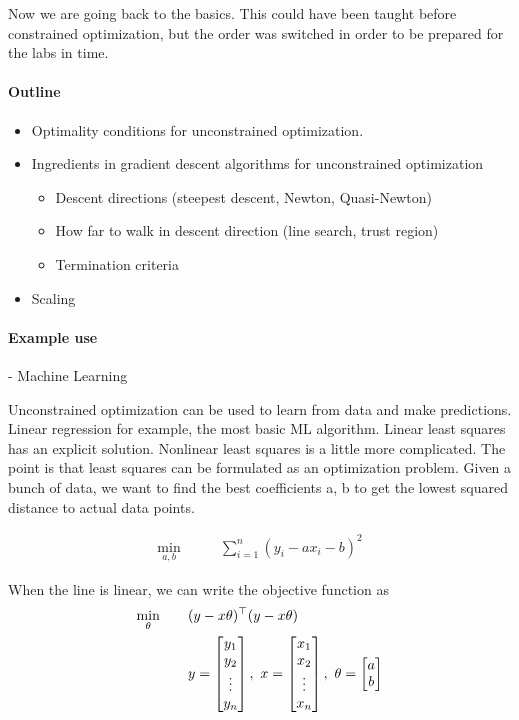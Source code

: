 \documentclass{article}
\begin{document}
\maketitle

Now we are going back to the basics. This could have been taught before constrained optimization, but the order
was switched in order to be prepared for the labs in time.

\paragraph{Outline}

\begin{itemize}
  \item Optimality conditions for unconstrained optimization.
  \item Ingredients in gradient descent algorithms for unconstrained optimization
        \begin{itemize}
          \item Descent directions (steepest descent, Newton, Quasi-Newton)
          \item How far to walk in descent direction (line search, trust region)
          \item Termination criteria
        \end{itemize}
  \item Scaling
\end{itemize}

\paragraph{Example use}- Machine Learning

\medskip Unconstrained optimization can be used to learn from data and make predictions. Linear regression for example,
the most basic ML algorithm. Linear least squares has an explicit solution. Nonlinear least squares is a little more complicated. The point is that least squares can be formulated
as an optimization problem. Given a bunch of data, we want to find the best coefficients a, b to get the lowest squared distance to actual data points.

\begin{align*}
  \min_{a, b}\qquad & \sum_{i = 1}^{n}(y_i - ax_i - b)^2
\end{align*}

When the line is linear, we can write the objective function as
\begin{align*}
  \min_{\theta}\qquad & (y-x\theta)^{\top}(y-x\theta) \\
                      & y = \begin{bmatrix} y_1                    \\ y_2 \\ \vdots  \\ y_n \end{bmatrix},\ x = \begin{bmatrix} x_1 \\ x_2 \\ \vdots \\ x_n \end{bmatrix} ,\ \theta = \begin{bmatrix} a \\ b \end{bmatrix}
\end{align*}
\end{document}
